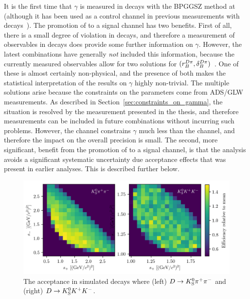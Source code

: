 It is the first time that $\gamma$ is measured in \BtoDpi decays with the BPGGSZ method at \lhcb (although it has been used as a control channel in previous measurements with \BtoDK decays~\cite{LHCb-PAPER-2012-027,LHCb-PAPER-2014-041,LHCb-PAPER-2018-017}). The promotion of \BtoDpi to a signal channel has two benefits. First of all, there is a small degree of \CP violation in \BtoDpi decays, and therefore a measurement of \CP observables in \BtoDpi decays does provide some further information on $\gamma$. However, the latest \lhcb combinations have generally \emph{not} included this information, because the currently measured \BtoDpi observables allow for two solutions for $(r_B^{{D}\pi}, \delta_B^{{D}\pi})$~\cite{LHCb-PAPER-2016-032}. One of these is almost certainly non-physical, and the presence of both makes the statistical interpretation of the results on $\gamma$ highly non-trivial. The multiple solutions arise because the constraints on the \BtoDpi parameters come from ADS/GLW measurements. As described in Section~\ref{sec:constraints_on_gamma}, the situation is resolved by the measurement presented in the thesis, and therefore \BtoDpi measurements can be included in future \lhcb combinations without incurring such problems. However, the \BtoDpi channel constrains $\gamma$ much less than the \BtoDK channel, and therefore the impact on the overall precision is small. The second, more significant, benefit from the promotion of \BtoDpi to a signal channel, is that the analysis avoids a significant systematic uncertainty due \lhcb acceptance effects that was present in earlier analyses. This is described further below.

\begin{figure}[tbp]
    \centering
    \includegraphics[width=\columnwidth]{figures/analysis/DP_thesis_profile_PiPi_and_KK_KK.png}
    \caption{The \lhcb acceptance in simulated \BtoDK decays where (left) ${D\rightarrow{\ensuremath{{K}^0_{\mathrm{S}}}}{\ensuremath{{\pi}^+}}{\ensuremath{{\pi}^-}}}$ and (right) ${D\rightarrow{\ensuremath{{K}^0_{\mathrm{S}}}}{\ensuremath{{K}^+}}{\ensuremath{{K}^-}}}$.}
    \label{fig:DP_profile}
\end{figure}

